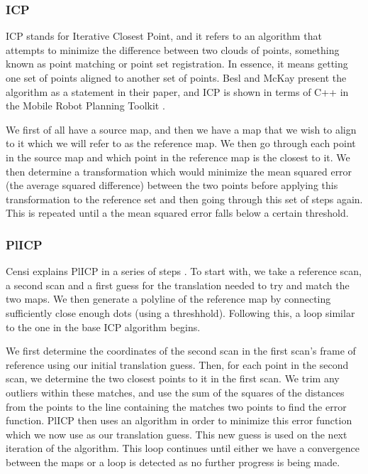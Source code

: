 					\subsubsection{ICP}
					ICP stands for Iterative Closest Point, and it refers to an algorithm that attempts to minimize the difference between two clouds of points, something known as point matching or point set registration. In essence, it means getting one set of points aligned to another set of points. Besl and McKay present the algorithm as a statement \cite{besl1992method} in their paper, and ICP is shown in terms of C++ in the Mobile Robot Planning Toolkit \citep{mrpt2013icp}. 
					
					We first of all have a source map, and then we have a map that we wish to align to it which we will refer to as the reference map. We then go through each point in the source map and which point in the reference map is the closest to it. We then determine a transformation which would minimize the mean squared error (the average squared difference) between the two points before applying this transformation to the reference set and then going through this set of steps again. This is repeated until a the mean squared error falls below a certain threshold.
					
					\subsubsection{PlICP}
					Censi explains PlICP in a series of steps \citep{censi2008icp}. To start with, we take a reference scan, a second scan and a first guess for the translation needed to try and match the two maps. We then generate a polyline of the reference map by connecting sufficiently close enough dots (using a threshhold). Following this, a loop similar to the one in the base ICP algorithm begins.
					
					We first determine the coordinates of the second scan in the first scan's frame of reference using our initial translation guess. Then, for each point in the second scan, we determine the two closest points to it in the first scan. We trim any outliers within these matches, and use the sum of the squares of the distances from the points to the line containing the matches two points to find the error function. PlICP then uses an algorithm in order to minimize this error function which we now use as our translation guess. This new guess is used on the next iteration of the algorithm. This loop continues until either we have a convergence between the maps or a loop is detected as no further progress is being made.	
					
